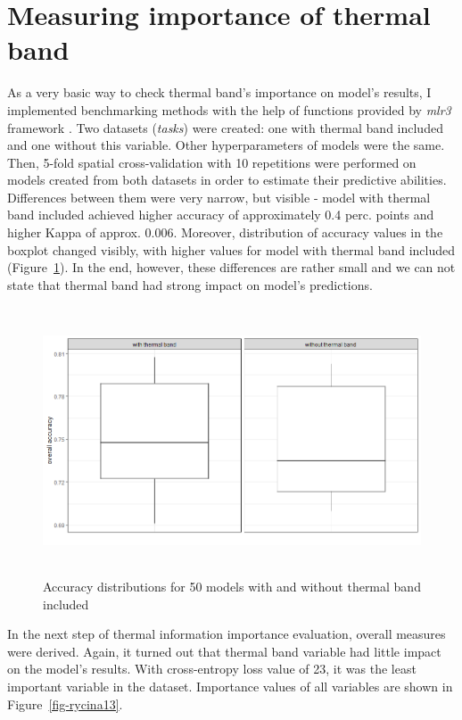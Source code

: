 \documentclass{amuthesis}
\begin{document}
\hypertarget{sec-imp-overall}{%
\section{Measuring importance of thermal band}\label{sec-imp-overall}}

As a very basic way to check thermal band's importance on model's
results, I implemented benchmarking methods with the help of functions
provided by \emph{mlr3} framework \autocite{R-mlr3}. Two datasets
(\emph{tasks}) were created: one with thermal band included and one
without this variable. Other hyperparameters of models were the same.
Then, 5-fold spatial cross-validation with 10 repetitions were performed
on models created from both datasets in order to estimate their
predictive abilities. Differences between them were very narrow, but
visible - model with thermal band included achieved higher accuracy of
approximately 0.4 perc. points and higher Kappa of approx. 0.006.
Moreover, distribution of accuracy values in the boxplot changed
visibly, with higher values for model with thermal band included
(Figure~\ref{fig-rycina12}). In the end, however, these differences are
rather small and we can not state that thermal band had strong impact on
model's predictions.

\begin{figure}[H]

{\centering \includegraphics[width=5.625in,height=3.125in]{./figures/model_comparison.png}

}

\caption{\label{fig-rycina12}Accuracy distributions for 50 models with
and without thermal band included}

\end{figure}

In the next step of thermal information importance evaluation, overall
measures were derived. Again, it turned out that thermal band variable
had little impact on the model's results. With cross-entropy loss value
of 23, it was the least important variable in the dataset. Importance
values of all variables are shown in Figure~\ref{fig-rycina13}.
\end{document}

